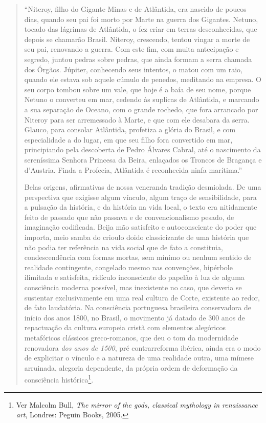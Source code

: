 \begin{quote}
``Niteroy, filho do Gigante Minas e de Atlântida, era nascido de poucos
dias, quando seu pai foi morto por Marte na guerra dos Gigantes. Netuno,
tocado das lágrimas de Atlântida, o fez criar em terras desconhecidas,
que depois se chamarão Brasil. Niteroy, crescendo, tentou vingar a morte
de seu pai, renovando a guerra. Com este fim, com muita antecipação e
segredo, juntou pedras sobre pedras, que ainda formam a serra chamada
dos Órgãos. Júpiter, conhecendo seus intentos, o matou com um raio,
quando ele estava sob aquele cúmulo de penedos, meditando na empresa. O
seu corpo tombou sobre um vale, que hoje é a baía de seu nome, porque
Netuno o converteu em mar, cedendo às suplicas de Atlântida, e marcando
a sua separação de Oceano, com o grande rochedo, que fora arrancado por
Niteroy para ser arremessado à Marte, e que com ele desabara da serra.
Glauco, para consolar Atlântida, profetiza a glória do Brasil, e com
especialidade a do lugar, em que seu filho fora convertido em mar,
principiando pela descoberta de Pedro Álvares Cabral, até o nascimento
da sereníssima Senhora Princesa da Beira, enlaçados os Troncos de
Bragança e d'Austria. Finda a Profecia, Atlântida é reconhecida ninfa
marítima.''

Belas origens, afirmativas de nossa veneranda tradição desmiolada. De
uma perspectiva que exigisse algum vínculo, algum traço de
sensibilidade, para a pulsação da história, e da história na vida local,
o texto era nitidamente feito de passado que não passava e de
convencionalismo pesado, de imaginação codificada. Beija mão satisfeito
e autoconsciente do poder que importa, meio samba do crioulo doido
classicizante de uma história que não podia ter referência na vida
social que de fato a constituia, condescendência com formas mortas, sem
mínimo ou nenhum sentido de realidade contingente, congelado mesmo nas
convenções, hipérbole ilimitada e satisfeita, ridículo inconsciente do
papelão à luz de alguma consciência moderna possível, mas inexistente no
caso, que deveria se sustentar exclusivamente em uma real cultura de
Corte, existente ao redor, de fato laudatória. Na consciência portuguesa
brasileira conservadora de início dos anos 1800, no Brasil, o movimento
já datado de 300 anos de repactuação da cultura europeia cristã com
elementos alegóricos metafóricos clássicos greco-romanos, que deu o tom
da modernidade renovadora \emph{dos anos de 1500}, pré contrarreforma
ibérica, ainda era o modo de explicitar o vínculo e a natureza de uma
realidade outra, uma mímese arruinada, alegoria dependente, da própria
ordem de deformação da consciência histórica\footnote{Ver Malcolm Bull,
  \emph{The mirror of the gods, classical mythology in renaissance art},
  Londres: Peguin Books, 2005.}.


\end{quote}
